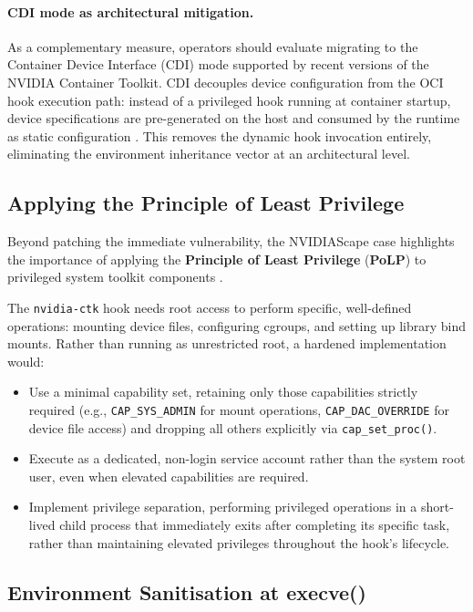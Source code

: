 \paragraph{CDI mode as architectural mitigation.}
As a complementary measure, operators should evaluate migrating to the Container Device Interface (CDI) mode supported by recent versions of the NVIDIA Container Toolkit. CDI decouples device configuration from the OCI hook execution path: instead of a privileged hook running at container startup, device specifications are pre-generated on the host and consumed by the runtime as static configuration \cite{cdi_spec}. This removes the dynamic hook invocation entirely, eliminating the environment inheritance vector at an architectural level.

\subsection{Applying the Principle of Least Privilege}
\label{subsec:least-privilege}

Beyond patching the immediate vulnerability, the NVIDIAScape case highlights the importance of applying the \textbf{Principle of Least Privilege} (\textbf{PoLP}) to privileged system toolkit components \cite{nist_sp800_190}.
 
The \texttt{nvidia-ctk} hook needs root access to perform specific, well-defined operations: mounting device files, configuring cgroups, and setting up library bind mounts. Rather than running as unrestricted root, a hardened implementation would:
 
\begin{itemize}
  \item Use a minimal capability set, retaining only those capabilities strictly required (e.g., \texttt{CAP\_SYS\_ADMIN} for mount operations, \texttt{CAP\_DAC\_OVERRIDE} for device file access) and dropping all others explicitly via \texttt{cap\_set\_proc()}.
  \item Execute as a dedicated, non-login service account rather than the system root user, even when elevated capabilities are required.
  \item Implement privilege separation, performing privileged operations in a short-lived child process that immediately exits after completing its specific task, rather than maintaining elevated privileges throughout the hook's lifecycle.
\end{itemize}

\subsection{Environment Sanitisation at execve()}
\label{subsec:env-sanitisation}

